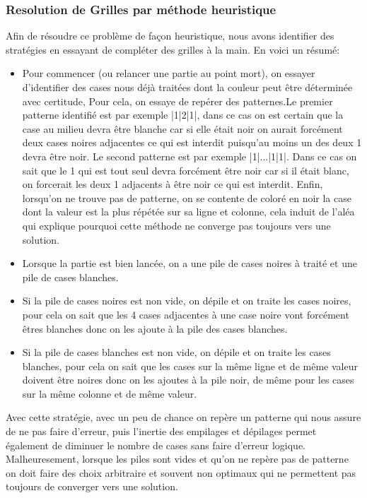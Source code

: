 \documentclass[a4paper,12pt,titlepage,leqno]{article}
\begin{document}
\subsubsection{Resolution de Grilles par méthode heuristique}
Afin de résoudre ce problème de façon heuristique, nous avons identifier des stratégies en essayant de compléter des grilles à la main. En voici un résumé:
\begin{itemize}
    \item Pour commencer (ou relancer une partie au point mort), on essayer d'identifier des cases nous déjà traitées dont la couleur peut être déterminée avec certitude, Pour cela, on essaye de repérer des patternes.\newline Le premier patterne identifié est par exemple |1|2|1|, dans ce cas on est certain que la case au milieu devra être blanche car si elle était noir on aurait forcément deux cases noires adjacentes ce qui est interdit puisqu'au moins un des deux 1 devra être noir.\newline
    Le second patterne est par exemple |1|...|1|1|. Dans ce cas on sait que le 1 qui est tout seul devra forcément être noir car si il était blanc, on forcerait les deux 1 adjacents à être noir ce qui est interdit.\newline
    Enfin, lorsqu'on ne trouve pas de patterne, on se contente de coloré en noir la case dont la valeur est la plus répétée sur sa ligne et colonne, cela induit de l'aléa qui explique pourquoi cette méthode ne converge pas toujours vers une solution.
    \item Lorsque la partie est bien lancée, on a une pile de cases noires à traité et une pile de cases blanches.
    \item Si la pile de cases noires est non vide, on dépile et on traite les cases noires, pour cela on sait que les 4 cases adjacentes à une case noire vont forcément êtres blanches donc on les ajoute à la pile des cases blanches.
    \item Si la pile de cases blanches est non vide, on dépile et on traite les cases blanches, pour cela on sait que les cases sur la même ligne et de même valeur doivent être noires donc on les ajoutes à la pile noir, de même pour les cases sur la même colonne et de même valeur.
\end{itemize}

Avec cette stratégie, avec un peu de chance on repère un patterne qui nous assure de ne pas faire d'erreur, puis l'inertie des empilages et dépilages permet également de diminuer le nombre de cases sans faire d'erreur logique. Malheuresement, lorsque les piles sont vides et qu'on ne repère pas de patterne on doit faire des choix arbitraire et souvent non optimaux qui ne permettent pas toujours de converger vers une solution.
\end{document}
